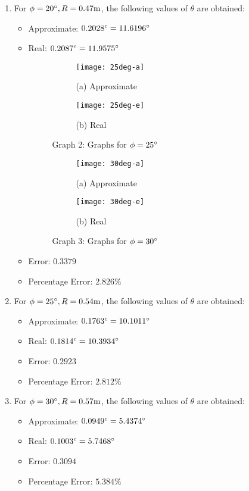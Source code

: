   \begin{enumerate}
  \item For $\phi=20\degree, R=0.47 \mathrm{m}$, the following values of $\theta$ are obtained:
    \begin{itemize}
    \item Approximate: $0.2028^c = 11.6196\degree$
    \item Real: $0.2087^c = 11.9575\degree$
      \cleartoleftpage
       \vspace*{1cm}
  \begin{figure}[!htb]
    \begin{subfigure}{9cm}
      \texttt{[image: 25deg-a]}
      \caption*{(a) Approximate}
    \end{subfigure}
    \begin{subfigure}{9cm}
      \texttt{[image: 25deg-e]}
      \caption*{(b) Real}
    \end{subfigure}
    \caption*{Graph 2: Graphs for $\phi = 25\degree$}
  \end{figure}
\vspace*{2cm}
  \begin{figure}[!htb]
    \begin{subfigure}{9cm}
      \texttt{[image: 30deg-a]}
      \caption*{(a) Approximate}
    \end{subfigure}
    \begin{subfigure}{9cm}
      \texttt{[image: 30deg-e]}
      \caption*{(b) Real}
    \end{subfigure}
    \caption*{Graph 3: Graphs for $\phi = 30\degree$}
    \end{figure}
      \cleardoublepage
    \item Error: $0.3379$
    \item Percentage Error: $2.826 \%$ 
    \end{itemize}
  \item For $\phi=25\degree, R=0.54 \mathrm{m}$, the following values of $\theta$ are obtained:
    \begin{itemize}
    \item Approximate: $0.1763^c = 10.1011\degree$
    \item Real: $0.1814^c = 10.3934\degree$
      \item Error: $0.2923$
      \item Percentage Error: $2.812 \%$
    \end{itemize}
  \item For $\phi=30\degree, R=0.57 \mathrm{m}$, the following values of $\theta$ are obtained:
    \begin{itemize}
    \item Approximate: $0.0949^c = 5.4374\degree$
    \item Real: $0.1003^c = 5.7468\degree$
      \item Error: $0.3094$
    \item Percentage Error: $5.384 \%$
      \end{itemize}
  \end{enumerate}
